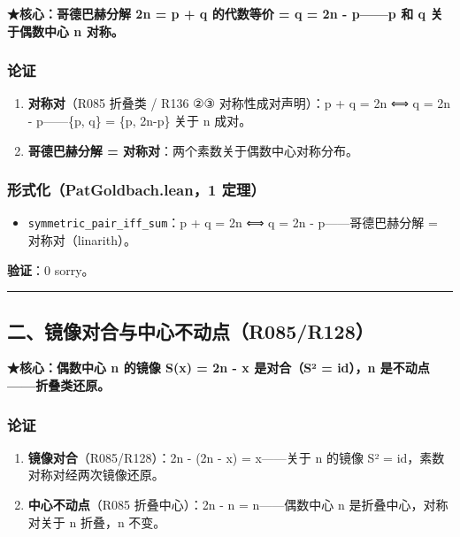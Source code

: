 \documentclass[
]{article}
\providecommand{\tightlist}{%
 \setlength{\itemsep}{0pt}\setlength{\parskip}{0pt}}
\begin{document}
\textbf{★核心：哥德巴赫分解 2n = p + q 的代数等价 = q = 2n - p------p 和
q 关于偶数中心 n 对称。}

\subsubsection{论证}\label{ux8bbaux8bc1}

\begin{enumerate}
\def\labelenumi{\arabic{enumi}.}
\tightlist
\item
 \textbf{对称对}（R085 折叠类 / R136 ②③ 对称性成对声明）：p + q = 2n ⟺
 q = 2n - p------\{p, q\} = \{p, 2n-p\} 关于 n 成对。
\item
 \textbf{哥德巴赫分解 = 对称对}：两个素数关于偶数中心对称分布。
\end{enumerate}

\subsubsection{形式化（PatGoldbach.lean，1
定理）}\label{ux5f62ux5f0fux5316patgoldbach.lean1-ux5b9aux7406}

\begin{itemize}
\tightlist
\item
 \texttt{symmetric\_pair\_iff\_sum}：p + q = 2n ⟺ q = 2n -
 p------哥德巴赫分解 = 对称对（linarith）。
\end{itemize}

\textbf{验证}：0 sorry。

\begin{center}\rule{0.5\linewidth}{0.5pt}\end{center}

\subsection{二、镜像对合与中心不动点（R085/R128）}\label{ux4e8cux955cux50cfux5bf9ux5408ux4e0eux4e2dux5fc3ux4e0dux52a8ux70b9r085r128}

\textbf{★核心：偶数中心 n 的镜像 S(x) = 2n - x 是对合（S² = id），n
是不动点------折叠类还原。}

\subsubsection{论证}\label{ux8bbaux8bc1-1}

\begin{enumerate}
\def\labelenumi{\arabic{enumi}.}
\tightlist
\item
 \textbf{镜像对合}（R085/R128）：2n - (2n - x) = x------关于 n 的镜像
 S² = id，素数对称对经两次镜像还原。
\item
 \textbf{中心不动点}（R085 折叠中心）：2n - n = n------偶数中心 n
 是折叠中心，对称对关于 n 折叠，n 不变。
\end{enumerate}
\end{document}
